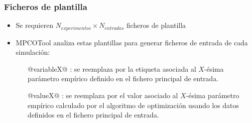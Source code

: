 \documentclass{beamer}
\begin{document}
\begin{frame}
	\frametitle{Ficheros de plantilla}
	\begin{itemize}
		\item Se requieren $N_{experimentos}\times N_{entradas}$ ficheros de
			plantilla
		\item MPCOTool analiza estas plantillas para generar ficheros de entrada
			de cada simulación:
		\begin{itemize}
			\item[@variableX@]: se reemplaza por la etiqueta asociada al $X$-ésima parámetro
	empírico definido en el fichero principal de entrada.
\item[@valueX@]: se reemplaza por el valor asociado al $X$-ésima parámetro
	empírico calculado por el algoritmo de optimización usando los datos
	definidos en el fichero principal de entrada.
		\end{itemize}
	\end{itemize}
\end{frame}
\end{document}
